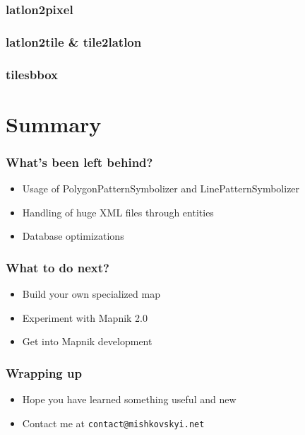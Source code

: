 \documentclass[17pt]{beamer}
\begin{document}
\begin{frame}
  \frametitle{latlon2pixel}

\end{frame}

\begin{frame}
  \frametitle{latlon2tile \& tile2latlon}

\end{frame}

\begin{frame}
  \frametitle{tilesbbox}

\end{frame}

\section*{Summary}

\begin{frame}
  \frametitle{What's been left behind?}
  \begin{itemize}
  \item Usage of PolygonPatternSymbolizer and LinePatternSymbolizer
  \item Handling of huge XML files through entities
  \item Database optimizations
  \end{itemize}
\end{frame}

\begin{frame}
  \frametitle{What to do next?}
  \begin{itemize}
  \item Build your own specialized map
  \item Experiment with Mapnik 2.0
  \item Get into Mapnik development
  \end{itemize}
\end{frame}

\begin{frame}
  \frametitle{Wrapping up}
  \begin{itemize}
  \item Hope you have learned something useful and new
  \item Contact me at \texttt{contact@mishkovskyi.net}
  \end{itemize}
\end{frame}

\end{document}
